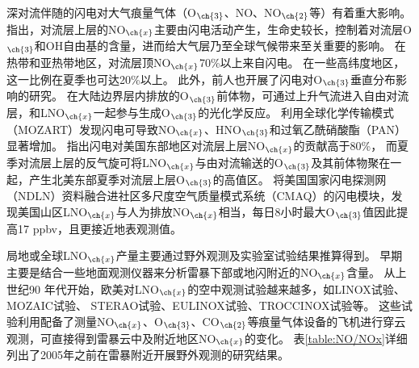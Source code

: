 深对流伴随的闪电对大气痕量气体（O$_{\ch{3}}$、NO、NO$_{\ch{2}}$等）有着重大影响\citep{DeCaria.2005,Schumann.2007,Ott.2010,Banerjee.2014}。
\citet{Levy.1996}指出，对流层上层的NO$_{\ch{x}}$主要由闪电活动产生，生命史较长，控制着对流层O$_{\ch{3}}$和OH自由基的含量，进而给大气层乃至全球气候带来至关重要的影响。
在热带和亚热带地区，对流层顶NO$_{\ch{x}}$70\%以上来自闪电。
在一些高纬度地区，这一比例在夏季也可达20\%以上\citep{Jourdain.2001,Martin.2002}。
此外，前人也开展了闪电对O$_{\ch{3}}$垂直分布影响的研究。
在大陆边界层内排放的O$_{\ch{3}}$前体物，可通过上升气流进入自由对流层，和LNO$_{\ch{x}}$一起参与生成O$_{\ch{3}}$的光化学反应\citep{Bond.2002}。
\citet{Tie.2001}利用全球化学传输模式（MOZART）发现闪电可导致NO$_{\ch{x}}$、HNO$_{\ch{3}}$和过氧乙酰硝酸酯（PAN）显著增加。
\citet{Cooper.2009}指出闪电对美国东部地区对流层上层NO$_{\ch{x}}$的贡献高于80\%，
而夏季对流层上层的反气旋可将LNO$_{\ch{x}}$与由对流输送的O$_{\ch{3}}$及其前体物聚在一起，产生北美东部夏季对流层上层O$_{\ch{3}}$的高值区。
\citet{Kang.2020}将美国国家闪电探测网（NDLN）资料融合进社区多尺度空气质量模式系统（CMAQ）的闪电模块，发现美国山区LNO$_{\ch{x}}$与人为排放NO$_{\ch{x}}$相当，每日8小时最大O$_{\ch{3}}$值因此提高17 ppbv，且更接近地表观测值。

局地或全球LNO$_{\ch{x}}$产量主要通过野外观测及实验室试验结果推算得到。
早期主要是结合一些地面观测仪器来分析雷暴下部或地闪附近的NO$_{\ch{x}}$含量。
从上世纪90 年代开始，欧美对LNO$_{\ch{x}}$的空中观测试验越来越多，如LINOX试验\citep{Huntrieser.1998}、 MOZAIC试验\citep{Marenco.1998}、
STERAO试验\citep{Dye.2000}、EULINOX试验\citep{Holler.2000}、TROCCINOX试验\citep{Huntrieser.2007}等。
这些试验利用配备了测量NO$_{\ch{x}}$、O$_{\ch{3}}$、CO$_{\ch{2}}$等痕量气体设备的飞机进行穿云观测，可直接得到雷暴云中及附近地区NO$_{\ch{x}}$的变化。
表\ref{table:NO/NOx}详细列出了2005年之前在雷暴附近开展野外观测的研究结果。


